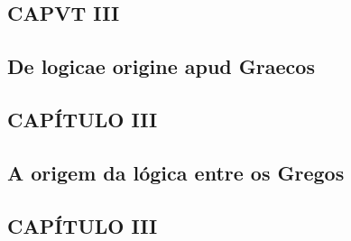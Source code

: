 \documentclass{article}
\begin{document}
\begin{paracol}{3} %
  \begin{nthcolumn*}{0} %
    \subsection*{\centering CAPVT III}
    \subsection*{\centering De logicae origine apud Graecos} 
  \end{nthcolumn*}
  \vspace{0.5cm}
  \begin{nthcolumn}{1} %
    \subsection*{\centering CAPÍTULO III}
    \subsection*{\centering A origem da lógica entre os Gregos}
  \end{nthcolumn}
  \vspace{0.5cm}
  \begin{nthcolumn}{2} %
    \subsection*{\centering CAPÍTULO III}

\end{nthcolumn}
\end{paracol}
\end{document}
